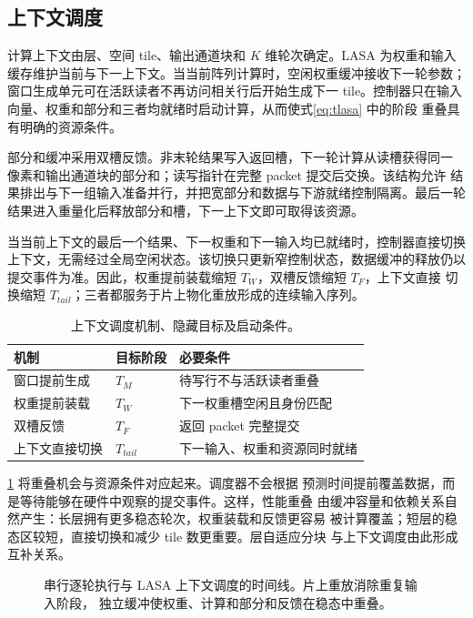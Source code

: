 \subsection{上下文调度}

计算上下文由层、空间 tile、输出通道块和 $K$ 维轮次确定。LASA 为权重和输入
缓存维护当前与下一上下文。当当前阵列计算时，空闲权重缓冲接收下一轮参数；
窗口生成单元可在活跃读者不再访问相关行后开始生成下一 tile。控制器只在输入
向量、权重和部分和三者均就绪时启动计算，从而使式\eqref{eq:tlasa} 中的阶段
重叠具有明确的资源条件。

部分和缓冲采用双槽反馈。非末轮结果写入返回槽，下一轮计算从读槽获得同一
像素和输出通道块的部分和；读写指针在完整 packet 提交后交换。该结构允许
结果排出与下一组输入准备并行，并把宽部分和数据与下游就绪控制隔离。最后一轮
结果进入重量化后释放部分和槽，下一上下文即可取得该资源。

当当前上下文的最后一个结果、下一权重和下一输入均已就绪时，控制器直接切换
上下文，无需经过全局空闲状态。该切换只更新窄控制状态，数据缓冲的释放仍以
提交事件为准。因此，权重提前装载缩短 $T_W$，双槽反馈缩短 $T_F$，上下文直接
切换缩短 $T_{tail}$；三者都服务于片上物化重放形成的连续输入序列。

\begin{table}[t]
\centering
\caption{上下文调度机制、隐藏目标及启动条件。}
\label{tab:schedule-mechanisms}
\small
\setlength{\tabcolsep}{2pt}
\begin{tabular}{p{18mm}p{13mm}p{38mm}}
\toprule
机制 & 目标阶段 & 必要条件 \\
\midrule
窗口提前生成 & $T_M$ & 待写行不与活跃读者重叠 \\
权重提前装载 & $T_W$ & 下一权重槽空闲且身份匹配 \\
双槽反馈 & $T_F$ & 返回 packet 完整提交 \\
上下文直接切换 & $T_{tail}$ & 下一输入、权重和资源同时就绪 \\
\bottomrule
\end{tabular}
\end{table}

\cref{tab:schedule-mechanisms} 将重叠机会与资源条件对应起来。调度器不会根据
预测时间提前覆盖数据，而是等待能够在硬件中观察的提交事件。这样，性能重叠
由缓冲容量和依赖关系自然产生：长层拥有更多稳态轮次，权重装载和反馈更容易
被计算覆盖；短层的稳态区较短，直接切换和减少 tile 数更重要。层自适应分块
与上下文调度由此形成互补关系。

\begin{figure}[t]
\centering
{}
\caption{串行逐轮执行与 LASA 上下文调度的时间线。片上重放消除重复输入阶段，
独立缓冲使权重、计算和部分和反馈在稳态中重叠。}
\label{fig:timeline-placeholder}
\end{figure}

